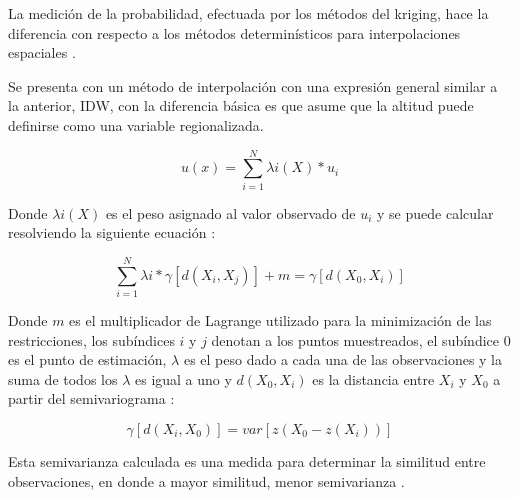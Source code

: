 La medición de la probabilidad, efectuada por los métodos del kriging, hace la diferencia con
respecto a los métodos determinísticos para interpolaciones espaciales
\citep{villatoro2007comparacion}.

Se presenta con un método de interpolación con una expresión general similar a la anterior, IDW,
con la diferencia básica es que asume que la altitud puede definirse como una variable
regionalizada.

\begin{equation}\label{eq:interpolacion-kriging}
 u(x) = \sum_{i=1}^{N} \lambda{i}(X) * u_{i}
\end{equation}

Donde $\lambda{i}(X)$ es el peso asignado al valor observado de $u_{i}$ y se puede calcular
resolviendo la siguiente ecuación :

\begin{equation}\label{eq:interpolacion-peso-kriging}
\sum_{i=1}^{N} \lambda{i}  * \gamma[d(X_{i}, X_{j})] + m = \gamma[d(X_{0}, X_{i})]
\end{equation}

Donde $m$ es el multiplicador de Lagrange utilizado para la minimización de las restricciones,
los subíndices $i$ y $j$ denotan a los puntos muestreados, el subíndice $0$ es el punto de
estimación, $\lambda$ es el peso dado a cada una de las observaciones y la suma de todos los
$\lambda$ es igual a uno y $d(X_{0}, X_{i})$ es la distancia entre $X_{i}$ y $X_{0}$ a partir del
semivariograma \citep{villatoro2007comparacion}:

\begin{equation}\label{eq:interpolacion-semivariograma}
\gamma[d(X_{i}, X_{0})] = var[z(X_{0} - z(X_{i}))]
\end{equation}

Esta semivarianza calculada es una medida para determinar la similitud entre observaciones, en
donde a mayor similitud, menor semivarianza \citep{villatoro2007comparacion}.
